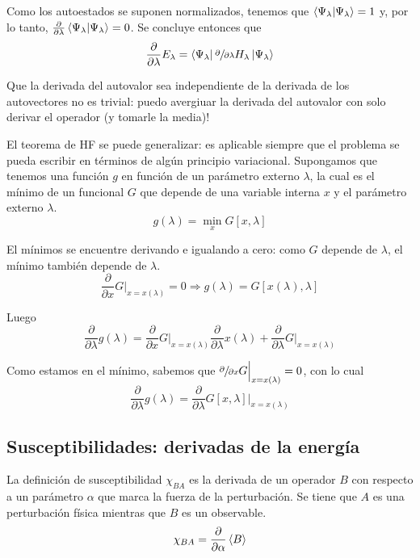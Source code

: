   Como los autoestados se suponen normalizados, tenemos que $\braket{\Psi_{\lambda}} = 1$ y, por lo tanto, $\frac{\partial}{\partial \lambda} \braket{\Psi_{\lambda}} = 0$. Se concluye entonces que
    $$\frac{\partial}{\partial \lambda} E_{\lambda} =
    \bra{\Psi_{\lambda}} \sfrac{\partial}{\partial \lambda}  H_{\lambda} \ket{\Psi_{\lambda}}$$

  Que la derivada del autovalor sea independiente de la derivada de los autovectores no es trivial: puedo avergiuar la derivada del autovalor con solo derivar el operador (y tomarle la media)!

  El teorema de HF se puede generalizar: es aplicable siempre que el problema se pueda escribir en términos de algún principio variacional. Supongamos que tenemos una función $g$ en función de un parámetro externo $\lambda$, la cual es el mínimo de un funcional $G$ que depende de una variable interna $x$ y el parámetro externo $\lambda$.
    $$g(\lambda) = \min_{x} G[x, \lambda]$$


  El mínimos se encuentre derivando e igualando a cero: como $G$ depende de $\lambda$, el mínimo también depende de $\lambda$.
    $$\frac{\partial}{\partial x} G \Big|_{x = x (\lambda)} = 0 \Rightarrow g(\lambda) = G[x (\lambda), \lambda]$$

  Luego
    $$\frac{\partial}{\partial \lambda} g (\lambda) = \frac{\partial}{\partial x} G \Big|_{x = x (\lambda)} \frac{\partial}{\partial \lambda} x (\lambda) + \frac{\partial}{\partial \lambda} G \Big|_{x = x (\lambda)}$$

  Como estamos en el mínimo, sabemos que $\sfrac{\partial}{\partial x} G \Big|_{x = x (\lambda)} = 0$, con lo cual
    $$\frac{\partial}{\partial \lambda} g (\lambda) = \frac{\partial}{\partial \lambda} G [x, \lambda] \Big|_{x = x (\lambda)}$$

\subsection{Susceptibilidades: derivadas de la energía}

  La definición de susceptibilidad $\chi_{BA}$ es la derivada de un operador $B$ con respecto a un parámetro $\alpha$ que marca la fuerza de la perturbación. Se tiene que $A$ es una perturbación física mientras que $B$ es un observable.
    $$\chi_{BA} = \frac{\partial}{\partial \alpha} \expval{B}$$

